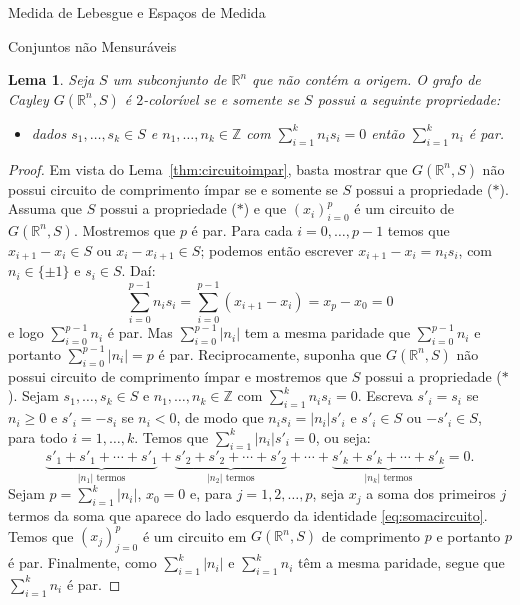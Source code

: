 \documentclass[oneside,final,11pt]{amsbook}
\newcommand{\R}{\mathds R}
\newcommand{\Z}{\mathds Z}
\theoremstyle{remark}\newtheorem{exercise}{Exercício}[chapter]
\theoremstyle{remark}\newtheorem{*exercise}[exercise]{\hbox to 0pt{\hskip 0pt minus 1fil*}Exercício}
\theoremstyle{definition}\newtheorem{exdefin}{Definição}[chapter]
\theoremstyle{plain}\newtheorem{teo}{Teorema}[section]
\theoremstyle{plain}\newtheorem{lem}[teo]{Lema}
\theoremstyle{plain}\newtheorem{prop}[teo]{Proposição}
\theoremstyle{plain}\newtheorem{cor}[teo]{Corolário}
\theoremstyle{definition}\newtheorem{defin}[teo]{Definição}
\theoremstyle{remark}\newtheorem{rem}[teo]{Observação}
\theoremstyle{definition}\newtheorem{notation}[teo]{Notação}
\theoremstyle{definition}\newtheorem{convention}[teo]{Convenção}
\theoremstyle{definition}\newtheorem{example}[teo]{Exemplo}
\numberwithin{section}{chapter}
\numberwithin{equation}{section}
\begin{document}
\begin{chapter}{Medida de Lebesgue e Espaços de Medida}
\begin{section}{Conjuntos não Mensuráveis}
\begin{lem}\label{thm:conjuntoadmissivel}
Seja $S$ um subconjunto de $\R^n$ que não contém a origem. O grafo de Cayley $G(\R^n,S)$ é\/ $2$-colorível
se e somente se $S$ possui a seguinte propriedade:
\begin{itemize}
\item[($*$)] dados $s_1,\ldots,s_k\in S$ e $n_1,\ldots,n_k\in\Z$ com $\sum_{i=1}^kn_is_i=0$ então
$\sum_{i=1}^kn_i$ é par.
\end{itemize}
\end{lem}
\begin{proof}
Em vista do Lema~\ref{thm:circuitoimpar}, basta mostrar que $G(\R^n,S)$ não possui circuito
de comprimento ímpar se e somente se $S$ possui a propriedade ($*$). Assuma que $S$ possui a propriedade
($*$) e que $(x_i)_{i=0}^p$ é um circuito de $G(\R^n,S)$. Mostremos que $p$ é par.
Para cada $i=0,\ldots,p-1$ temos que $x_{i+1}-x_i\in S$ ou $x_i-x_{i+1}\in S$; podemos então
escrever $x_{i+1}-x_i=n_is_i$, com $n_i\in\{\pm1\}$ e $s_i\in S$. Daí:
\[\sum_{i=0}^{p-1}n_is_i=\sum_{i=0}^{p-1}(x_{i+1}-x_i)=x_p-x_0=0\]
e logo $\sum_{i=0}^{p-1}n_i$ é par. Mas $\sum_{i=0}^{p-1}\vert n_i\vert$ tem a mesma paridade
que $\sum_{i=0}^{p-1}n_i$ e portanto $\sum_{i=0}^{p-1}\vert n_i\vert=p$ é par. Reciprocamente, suponha que
$G(\R^n,S)$ não possui circuito de comprimento ímpar e mostremos que $S$ possui a propriedade
($*$). Sejam $s_1,\ldots,s_k\in S$ e $n_1,\ldots,n_k\in\Z$ com $\sum_{i=1}^kn_is_i=0$. Escreva
$s'_i=s_i$ se $n_i\ge0$ e $s'_i=-s_i$ se $n_i<0$, de modo que $n_is_i=\vert n_i\vert s'_i$ e
$s'_i\in S$ ou $-s'_i\in S$, para todo $i=1,\ldots,k$. Temos que $\sum_{i=1}^k\vert n_i\vert s'_i=0$, ou seja:
\begin{equation}\label{eq:somacircuito}
\underbrace{s'_1+s'_1+\cdots+s'_1}_{\text{$\vert n_1\vert$ termos}}+
\underbrace{s'_2+s'_2+\cdots+s'_2}_{\text{$\vert n_2\vert$ termos}}+\cdots+
\underbrace{s'_k+s'_k+\cdots+s'_k}_{\text{$\vert n_k\vert$ termos}}=0.
\end{equation}
Sejam $p=\sum_{i=1}^k\vert n_i\vert$, $x_0=0$ e, para $j=1,2,\ldots,p$, seja $x_j$ a soma dos primeiros $j$ termos da
soma que aparece do lado esquerdo da identidade \eqref{eq:somacircuito}. Temos que $(x_j)_{j=0}^p$ é um circuito
em $G(\R^n,S)$ de comprimento $p$ e portanto $p$ é par. Finalmente,
como $\sum_{i=1}^k\vert n_i\vert$ e $\sum_{i=1}^kn_i$ têm a mesma paridade, segue que
$\sum_{i=1}^kn_i$ é par.
\end{proof}


\end{section}
\end{chapter}
\end{document}
